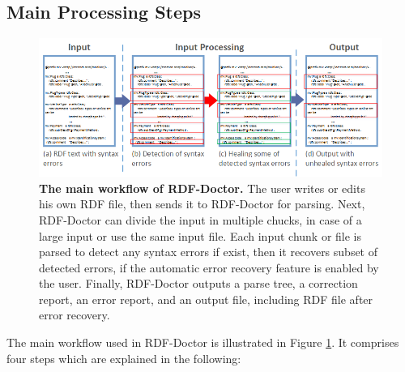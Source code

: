 \subsection{Main Processing Steps}

\begin{figure}
	\centering
	  	\includegraphics[width=1\textwidth]{images/Approach.png}
		\caption{\textbf{The main workflow of RDF-Doctor.} The user writes or edits his own RDF file, then sends it to RDF-Doctor for parsing.
		Next, RDF-Doctor can divide the input in multiple chucks, in case of a large input or use the same input file. 
		Each input chunk or file is parsed to detect any syntax errors if exist, then it recovers subset of detected errors, if the automatic error recovery feature is enabled by the user. 
		Finally, RDF-Doctor outputs a parse tree, a correction report, an error report, and an output file, including RDF file after error recovery.}
		\label{Fig:Approach}  
\end{figure}

The main workflow used in RDF-Doctor is illustrated in Figure \ref{Fig:Approach}.
It comprises four steps which are explained in the following:

